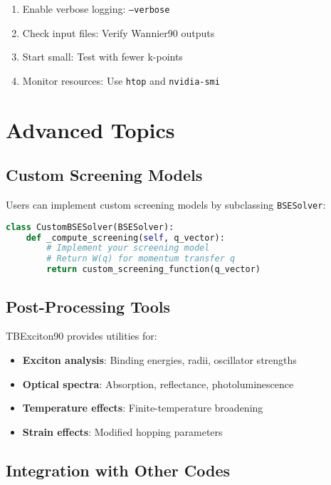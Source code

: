 \documentclass[11pt,a4paper]{article}
\newcommand{\code}[1]{\texttt{#1}}
\begin{document}
\begin{enumerate}
    \item Enable verbose logging: \code{--verbose}
    \item Check input files: Verify Wannier90 outputs
    \item Start small: Test with fewer k-points
    \item Monitor resources: Use \code{htop} and \code{nvidia-smi}
\end{enumerate}

\section{Advanced Topics}

\subsection{Custom Screening Models}

Users can implement custom screening models by subclassing \code{BSESolver}:

\begin{lstlisting}[language=Python]
class CustomBSESolver(BSESolver):
    def _compute_screening(self, q_vector):
        # Implement your screening model
        # Return W(q) for momentum transfer q
        return custom_screening_function(q_vector)
\end{lstlisting}

\subsection{Post-Processing Tools}

TBExciton90 provides utilities for:

\begin{itemize}
    \item \textbf{Exciton analysis}: Binding energies, radii, oscillator strengths
    \item \textbf{Optical spectra}: Absorption, reflectance, photoluminescence
    \item \textbf{Temperature effects}: Finite-temperature broadening
    \item \textbf{Strain effects}: Modified hopping parameters
\end{itemize}

\subsection{Integration with Other Codes}
\end{document}
